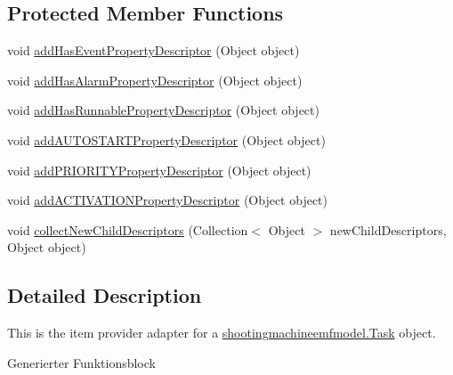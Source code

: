 \subsection*{Protected Member Functions}
\begin{DoxyCompactItemize}
\item 
void \hyperlink{classshootingmachineemfmodel_1_1provider_1_1_task_item_provider_a46388eb06dff43c420f5451993d500d1}{add\-Has\-Event\-Property\-Descriptor} (Object object)
\item 
void \hyperlink{classshootingmachineemfmodel_1_1provider_1_1_task_item_provider_aa1b4ca93aef82ba5508f073de5c85e61}{add\-Has\-Alarm\-Property\-Descriptor} (Object object)
\item 
void \hyperlink{classshootingmachineemfmodel_1_1provider_1_1_task_item_provider_aadaf6c65dd19279a8ae301759b1920b9}{add\-Has\-Runnable\-Property\-Descriptor} (Object object)
\item 
void \hyperlink{classshootingmachineemfmodel_1_1provider_1_1_task_item_provider_a4921d29b1aef4f86aa8431c0ff214940}{add\-A\-U\-T\-O\-S\-T\-A\-R\-T\-Property\-Descriptor} (Object object)
\item 
void \hyperlink{classshootingmachineemfmodel_1_1provider_1_1_task_item_provider_aa2f10c0ba95f08fe562b37862d0e3896}{add\-P\-R\-I\-O\-R\-I\-T\-Y\-Property\-Descriptor} (Object object)
\item 
void \hyperlink{classshootingmachineemfmodel_1_1provider_1_1_task_item_provider_acc7870d346a797328d7c2bf518b19f47}{add\-A\-C\-T\-I\-V\-A\-T\-I\-O\-N\-Property\-Descriptor} (Object object)
\item 
void \hyperlink{classshootingmachineemfmodel_1_1provider_1_1_task_item_provider_a90add04c68a3568f7b63d07c56173948}{collect\-New\-Child\-Descriptors} (Collection$<$ Object $>$ new\-Child\-Descriptors, Object object)
\end{DoxyCompactItemize}


\subsection{Detailed Description}
This is the item provider adapter for a \hyperlink{interfaceshootingmachineemfmodel_1_1_task}{shootingmachineemfmodel.\-Task} object.

Generierter Funktionsblock 

